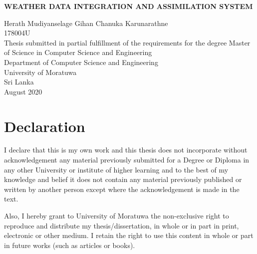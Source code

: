 \documentclass[a4paper,oneside,12pt]{report}
\begin{document}
\begin{titlepage}
    \begin{center}
        \Large{
        \textbf{WEATHER DATA INTEGRATION AND ASSIMILATION SYSTEM}}\\
        \vspace{144pt}
  \large      

        Herath Mudiyanselage Gihan Chanuka Karunarathne\\
        \vspace{24pt}
        178004U\\
         \vspace{72pt}
        \normalsize
        Thesis submitted in partial fulfillment of the requirements for the degree Master of Science in Computer Science and Engineering\\
     
       \vspace{72pt}
        \large
        Department of Computer Science and Engineering\\
        \vspace{24pt}
        University of Moratuwa\\
        Sri Lanka\\
        \vspace{32pt}
        August 2020
        
    \end{center}
\end{titlepage}


\chapter*{Declaration}

I declare that this is my own work and this thesis does not
incorporate without acknowledgement any material previously submitted for a
Degree or Diploma in any other University or institute of higher learning and to
the best of my knowledge and belief it does not contain any material previously
published or written by another person except where the acknowledgement is
made in the text.

Also, I hereby grant to University of Moratuwa the non-exclusive right to
reproduce and distribute my thesis/dissertation, in whole or in part in print,
electronic or other medium. I retain the right to use this content in whole or part
in future works (such as articles or books).
\end{document}
